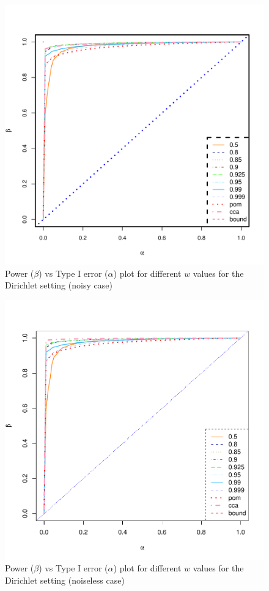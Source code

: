 \documentclass[11pt]{article} %
\begin{document}
\begin{figure}
\includegraphics[scale=0.35]{Dirichlet-FC-Tradeoff-OOSc0-01-n150.pdf}
\caption{Power ($\beta$) vs Type I error ($\alpha$) plot for different $w$ values for the Dirichlet setting (noisy case)}
\label{fig:Dir-c001-power-alpha}
\end{figure}

\begin{figure}
\includegraphics[scale=0.35]{Dirichlet-FC-Tradeoff-OOSc0-n150.pdf}
\caption{Power ($\beta$) vs Type I error ($\alpha$) plot for different $w$ values for the Dirichlet setting (noiseless case)}
\label{fig:Dir-c0-power-alpha}
\end{figure}
\end{document}
